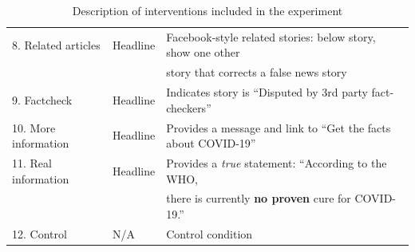 \documentclass[letterpaper, 12pt, parskip=full,DIV=10]{scrartcl}
\begin{document}
\begin{table}[H]
\begin{adjustbox}{max width = \textwidth}
\begin{tabular}{l|l|l}
\\
8. Related articles                                                                                                       & Headline                                                                                                     & Facebook-style related stories: below story, show one other\\ & &  story that corrects a false news story                                                                                                                                                                                                                                                                                             \\
9. Factcheck                                                                                                      & Headline                                                                                                     & Indicates story is ``Disputed by 3rd party fact-checkers''
 \\
10. More information                                                                                                      & Headline                                                                                                     & Provides a message and link to ``Get the facts about COVID-19''\\
11. Real information                                                                                                      & Headline                                                                                                     & Provides a \textit{true} statement: ``According to the WHO,\\ & & there is currently \textbf{no proven} cure for COVID-19.''
 \\
12. Control                                                                                                        & N/A                                                                                                          & Control condition                                                                                                                                                                                                                                                                                                                                                                                              
\end{tabular}
\end{adjustbox}
\caption{Description of interventions included in the experiment}
\label{tab:treatments}
\end{table}
\end{document}
